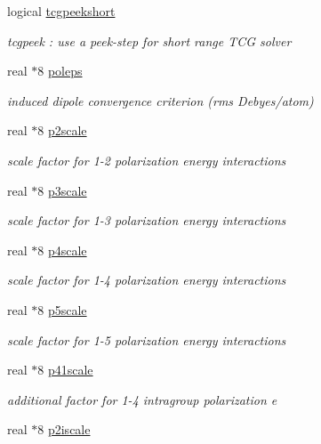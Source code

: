 \begin{DoxyCompactItemize}
logical \hyperlink{classpolpot_a73af9eaecbba722071b6c0041d2ba4f5}{tcgpeekshort}
\begin{DoxyCompactList}\small\item\em tcgpeek \-: use a peek-\/step for short range T\-C\-G solver \end{DoxyCompactList}\item 
real $\ast$8 \hyperlink{classpolpot_a9fe6988d34a71ea38554d7050313b34a}{poleps}
\begin{DoxyCompactList}\small\item\em induced dipole convergence criterion (rms Debyes/atom) \end{DoxyCompactList}\item 
real $\ast$8 \hyperlink{classpolpot_aa8be13777bcaf7e8588e213a1314b4b1}{p2scale}
\begin{DoxyCompactList}\small\item\em scale factor for 1-\/2 polarization energy interactions \end{DoxyCompactList}\item 
real $\ast$8 \hyperlink{classpolpot_a9acb74d6d1ab628d38abe5e78eb3e085}{p3scale}
\begin{DoxyCompactList}\small\item\em scale factor for 1-\/3 polarization energy interactions \end{DoxyCompactList}\item 
real $\ast$8 \hyperlink{classpolpot_a88cbeff943a0696443b4d2da069b65cc}{p4scale}
\begin{DoxyCompactList}\small\item\em scale factor for 1-\/4 polarization energy interactions \end{DoxyCompactList}\item 
real $\ast$8 \hyperlink{classpolpot_a9e34898b348ec7377b3e659b00cfbd36}{p5scale}
\begin{DoxyCompactList}\small\item\em scale factor for 1-\/5 polarization energy interactions \end{DoxyCompactList}\item 
real $\ast$8 \hyperlink{classpolpot_a597b6d994d068ea202fba93510f45ed3}{p41scale}
\begin{DoxyCompactList}\small\item\em additional factor for 1-\/4 intragroup polarization e \end{DoxyCompactList}\item 
real $\ast$8 \hyperlink{classpolpot_a2ee10885cf2d88a471e57d26820ea244}{p2iscale}

\end{DoxyCompactItemize}
